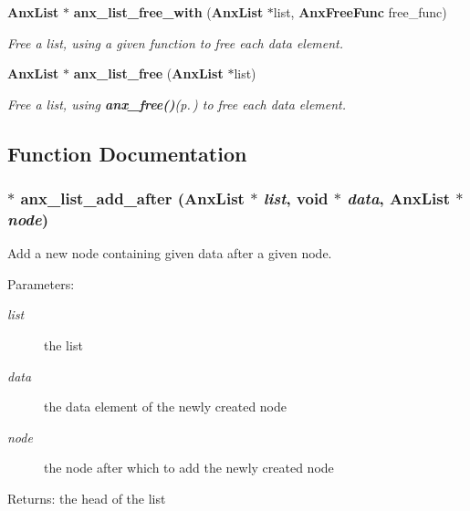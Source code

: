 \begin{CompactItemize}
{\bf Anx\-List} $\ast$ {\bf anx\_\-list\_\-free\_\-with} ({\bf Anx\-List} $\ast$list, {\bf Anx\-Free\-Func} free\_\-func)
\begin{CompactList}\small\item\em Free a list, using a given function to free each data element. \item\end{CompactList}\item 
{\bf Anx\-List} $\ast$ {\bf anx\_\-list\_\-free} ({\bf Anx\-List} $\ast$list)
\begin{CompactList}\small\item\em Free a list, using {\bf anx\_\-free()}{\rm (p.\,\pageref{anx__core_8h_a1})} to free each data element. \item\end{CompactList}\end{CompactItemize}


\subsection{Function Documentation}
\subsubsection{$\ast$ anx\_\-list\_\-add\_\-after ({\bf Anx\-List} $\ast$ {\em list}, void $\ast$ {\em data}, {\bf Anx\-List} $\ast$ {\em node})}\label{anx__list_8h_a8}


Add a new node containing given data after a given node. 

\begin{Desc}
\item[Parameters:]
\begin{description}
\item[{\em list}]the list \item[{\em data}]the data element of the newly created node \item[{\em node}]the node after which to add the newly created node \end{description}
\end{Desc}
\begin{Desc}
\item[Returns:]the head of the list \end{Desc}
